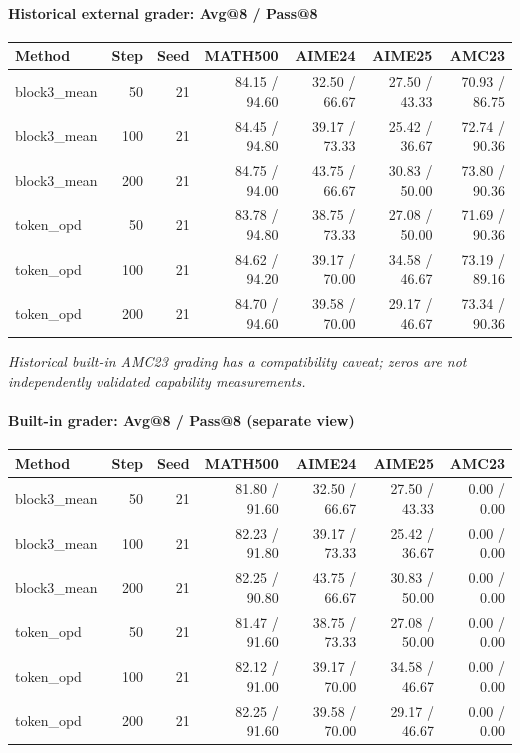 \paragraph{Historical external grader: Avg@8 / Pass@8}
{\footnotesize\setlength{\tabcolsep}{3.5pt}
\begin{longtable}{@{}p{1.4in}rrrrrr@{}}
\toprule
Method & Step & Seed & MATH500 & AIME24 & AIME25 & AMC23 \\
\midrule\endhead
block3\_\allowbreak{}mean & 50 & 21 & 84.15 / 94.60 & 32.50 / 66.67 & 27.50 / 43.33 & 70.93 / 86.75 \\
block3\_\allowbreak{}mean & 100 & 21 & 84.45 / 94.80 & 39.17 / 73.33 & 25.42 / 36.67 & 72.74 / 90.36 \\
block3\_\allowbreak{}mean & 200 & 21 & 84.75 / 94.00 & 43.75 / 66.67 & 30.83 / 50.00 & 73.80 / 90.36 \\
token\_\allowbreak{}opd & 50 & 21 & 83.78 / 94.80 & 38.75 / 73.33 & 27.08 / 50.00 & 71.69 / 90.36 \\
token\_\allowbreak{}opd & 100 & 21 & 84.62 / 94.20 & 39.17 / 70.00 & 34.58 / 46.67 & 73.19 / 89.16 \\
token\_\allowbreak{}opd & 200 & 21 & 84.70 / 94.60 & 39.58 / 70.00 & 29.17 / 46.67 & 73.34 / 90.36 \\
\bottomrule\end{longtable}
}
\emph{Historical built-in AMC23 grading has a compatibility caveat; zeros are not independently validated capability measurements.}
\paragraph{Built-in grader: Avg@8 / Pass@8 (separate view)}
{\footnotesize\setlength{\tabcolsep}{3.5pt}
\begin{longtable}{@{}p{1.4in}rrrrrr@{}}
\toprule
Method & Step & Seed & MATH500 & AIME24 & AIME25 & AMC23 \\
\midrule\endhead
block3\_\allowbreak{}mean & 50 & 21 & 81.80 / 91.60 & 32.50 / 66.67 & 27.50 / 43.33 & 0.00 / 0.00 \\
block3\_\allowbreak{}mean & 100 & 21 & 82.23 / 91.80 & 39.17 / 73.33 & 25.42 / 36.67 & 0.00 / 0.00 \\
block3\_\allowbreak{}mean & 200 & 21 & 82.25 / 90.80 & 43.75 / 66.67 & 30.83 / 50.00 & 0.00 / 0.00 \\
token\_\allowbreak{}opd & 50 & 21 & 81.47 / 91.60 & 38.75 / 73.33 & 27.08 / 50.00 & 0.00 / 0.00 \\
token\_\allowbreak{}opd & 100 & 21 & 82.12 / 91.00 & 39.17 / 70.00 & 34.58 / 46.67 & 0.00 / 0.00 \\
token\_\allowbreak{}opd & 200 & 21 & 82.25 / 91.60 & 39.58 / 70.00 & 29.17 / 46.67 & 0.00 / 0.00 \\
\bottomrule\end{longtable}
}

